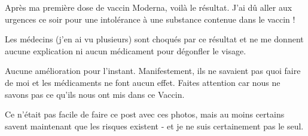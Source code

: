 Après ma première dose de vaccin Moderna, voilà le résultat. J'ai dû aller aux
urgences ce soir pour une intolérance à une substance contenue dans le vaccin !

Les médecins (j'en ai vu plusieurs) sont choqués par ce résultat et ne me
donnent aucune explication ni aucun médicament pour dégonfler le visage.

Aucune amélioration pour l'instant. Manifestement, ils ne savaient pas quoi
faire de moi et les médicaments ne font aucun effet. Faites attention car nous
ne savons pas ce qu'ils nous ont mis dans ce Vaccin.

Ce n'était pas facile de faire ce post avec ces photos, mais au moins certains
savent maintenant que les risques existent - et je ne suis certainement pas le
seul.
